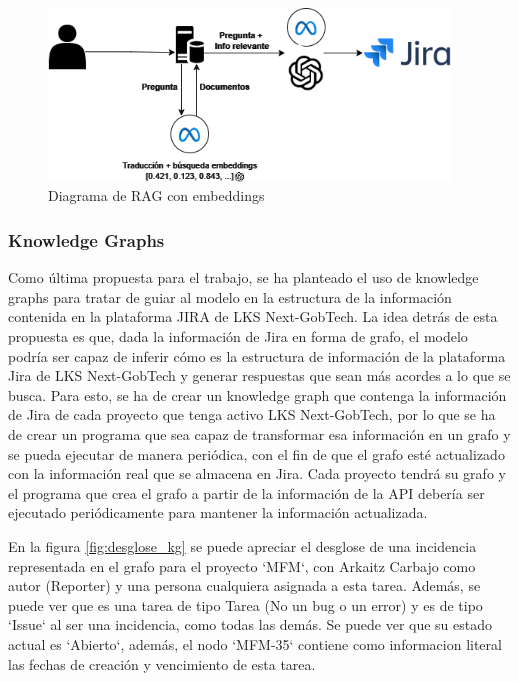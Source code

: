 \begin{figure}[H]
    \centering
    \includegraphics[width=0.95\textwidth]{images/rag_embeddings.png}
    \caption{Diagrama de RAG con embeddings}\label{fig:embeddings}
\end{figure}

\subsubsection{Knowledge Graphs}
Como última propuesta para el trabajo, se ha planteado el uso de knowledge graphs para tratar de guiar al modelo en la estructura de la información contenida en la plataforma JIRA de LKS Next-GobTech. La idea detrás de esta propuesta es que, dada la información de Jira en forma de grafo, el modelo podría ser capaz de inferir cómo es la estructura de información de la plataforma Jira de LKS Next-GobTech y generar respuestas que sean más acordes a lo que se busca. Para esto, se ha de crear un knowledge graph que contenga la información de Jira de cada proyecto que tenga activo LKS Next-GobTech, por lo que se ha de crear un programa que sea capaz de transformar esa información en un grafo y se pueda ejecutar de manera periódica, con el fin de que el grafo esté actualizado con la información real que se almacena en Jira. Cada proyecto tendrá su grafo y el programa que crea el grafo a partir de la información de la API debería ser ejecutado periódicamente para mantener la información actualizada.

En la figura \ref{fig:desglose_kg} se puede apreciar el desglose de una incidencia representada en el grafo para el proyecto `MFM`, con Arkaitz Carbajo como autor (Reporter) y una persona cualquiera asignada a esta tarea. Además, se puede ver que es una tarea de tipo Tarea (No un bug o un error) y es de tipo `Issue` al ser una incidencia, como todas las demás. Se puede ver que su estado actual es `Abierto`, además, el nodo `MFM-35` contiene como informacion literal las fechas de creación y vencimiento de esta tarea.

